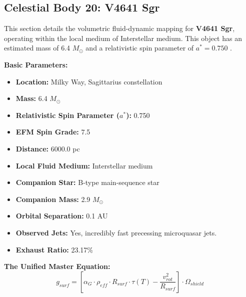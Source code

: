 \documentclass[11pt, a4paper]{article}
\begin{document}
\clearpage
\subsection{Celestial Body 20: V4641 Sgr}
This section details the volumetric fluid-dynamic mapping for \textbf{V4641 Sgr}, operating within the local medium of Interstellar medium. This object has an estimated mass of 6.4 $M_{\odot}$ and a relativistic spin parameter of $a^* = 0.750$ \cite{orosz2001, simbad}.

\vspace{0.5em}
\noindent \textbf{Basic Parameters:}
\begin{itemize}
  \item \textbf{Location:} Milky Way, Sagittarius constellation
  \item \textbf{Mass:} 6.4 $M_{\odot}$
  \item \textbf{Relativistic Spin Parameter ($a^*$):} 0.750
  \item \textbf{EFM Spin Grade:} 7.5
  \item \textbf{Distance:} 6000.0 pc
  \item \textbf{Local Fluid Medium:} Interstellar medium
  \item \textbf{Companion Star:} B-type main-sequence star
  \item \textbf{Companion Mass:} 2.9 $M_{\odot}$
  \item \textbf{Orbital Separation:} 0.1 AU
  \item \textbf{Observed Jets:} Yes, incredibly fast precessing microquasar jets.
  \item \textbf{Exhaust Ratio:} 23.17\%
\end{itemize}

\vspace{0.5em}
\noindent \textbf{The Unified Master Equation:}
$$ g_{surf} = \left[ \alpha_G \cdot \rho_{eff} \cdot R_{surf} \cdot \tau(T) - \frac{v_{rot}^2}{R_{surf}} \right] \cdot \Omega_{shield} $$
\end{document}
